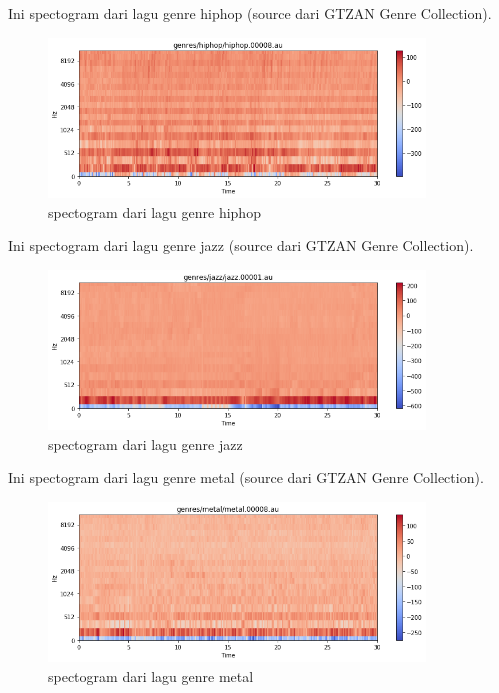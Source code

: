 Ini spectogram dari lagu genre hiphop (source dari GTZAN Genre Collection).

\begin{figure}[H]
	\centering
	\includegraphics[width=10cm]{figures/1174083/figures6/16.png}
	\caption{spectogram dari lagu genre hiphop}
\end{figure}

Ini spectogram dari lagu genre jazz (source dari GTZAN Genre Collection).

\begin{figure}[H]
	\centering
	\includegraphics[width=10cm]{figures/1174083/figures6/17.png}
	\caption{spectogram dari lagu genre jazz}
\end{figure}

Ini spectogram dari lagu genre metal (source dari GTZAN Genre Collection).

\begin{figure}[H]
	\centering
	\includegraphics[width=10cm]{figures/1174083/figures6/18.png}
	\caption{spectogram dari lagu genre metal}
\end{figure}

